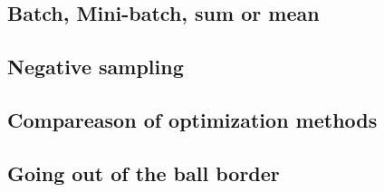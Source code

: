 \documentclass{article}
\begin{document}
            \subsection{Batch, Mini-batch, sum or mean}

            \subsection{Negative sampling}

            \subsection{Compareason of optimization methods}

            \subsection{Going out of the ball border}
            
\end{document}
